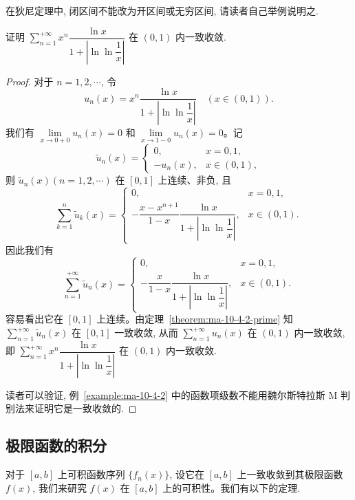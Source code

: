 \begin{remark}\label{remark:ma-10-source-57}
在狄尼定理中, 闭区间不能改为开区间或无穷区间, 请读者自己举例说明之.
\end{remark}


\begin{example}\label{example:ma-10-4-2}
证明 $\sum\limits_{n=1}^{+\infty}x^n\dfrac{\ln x}{1+\left|\ln\ln\dfrac1x\right|}$ 在 $(0,1)$ 内一致收敛.
\end{example}


\begin{proof}
对于 $n=1,2,\cdots$, 令
\[
  u_n(x)=x^n\frac{\ln x}{1+\left|\ln\ln\dfrac1x\right|}\quad(x\in(0,1)).
\]
我们有 $\lim\limits_{x\to0+0}u_n(x)=0$ 和 $\lim\limits_{x\to1-0}u_n(x)=0$。记
\[
  \widetilde u_n(x)=
  \begin{cases}
    0, & x=0,1,\\
    -u_n(x), & x\in(0,1),
  \end{cases}
\]
则 $\widetilde u_n(x)(n=1,2,\cdots)$ 在 $[0,1]$ 上连续、非负, 且
\[
  \sum_{k=1}^n\widetilde u_k(x)=
  \begin{cases}
    0, & x=0,1,\\
    -\dfrac{x-x^{n+1}}{1-x}\dfrac{\ln x}{1+\left|\ln\ln\dfrac1x\right|}, & x\in(0,1).
  \end{cases}
\]
因此我们有
\[
  \sum_{n=1}^{+\infty}\widetilde u_n(x)=
  \begin{cases}
    0, & x=0,1,\\
    -\dfrac{x}{1-x}\dfrac{\ln x}{1+\left|\ln\ln\dfrac1x\right|}, & x\in(0,1).
  \end{cases}
\]
容易看出它在 $[0,1]$ 上连续。由定理~\ref{theorem:ma-10-4-2-prime} 知 $\sum\limits_{n=1}^{+\infty}\widetilde u_n(x)$ 在 $[0,1]$ 一致收敛, 从而 $\sum\limits_{n=1}^{+\infty}u_n(x)$ 在 $(0,1)$ 内一致收敛, 即 $\sum\limits_{n=1}^{+\infty}x^n\dfrac{\ln x}{1+\left|\ln\ln\dfrac1x\right|}$ 在 $(0,1)$ 内一致收敛.

读者可以验证, 例~\ref{example:ma-10-4-2} 中的函数项级数不能用魏尔斯特拉斯 M 判别法来证明它是一致收敛的.
\end{proof}


\subsection{极限函数的积分}
\label{subsec:ma-10-4-2}

对于 $[a,b]$ 上可积函数序列 $\{f_n(x)\}$, 设它在 $[a,b]$ 上一致收敛到其极限函数 $f(x)$, 我们来研究 $f(x)$ 在 $[a,b]$ 上的可积性。我们有以下的定理.

